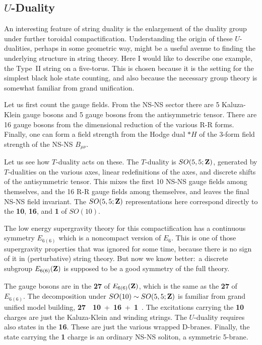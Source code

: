 \subsection{$U$-Duality}

An interesting feature of string duality is the enlargement of the duality
group under further toroidal compactification.  Understanding the origin of
these $U$-dualities, perhaps in some geometric way, might be a useful avenue
to finding the underlying structure in string theory.  Here I would like to
describe one example, the Type~II string on a five-torus.  This is chosen
because it is the setting for the simplest black hole state counting, and
also because the necessary group theory is somewhat familiar from grand
unification.

Let us first count the gauge fields.  From the NS-NS sector there are 5
Kaluza-Klein gauge bosons and 5 gauge bosons from the antisymmetric tensor. 
There are 16 gauge bosons from the dimensional reduction of the various R-R
forms.  Finally, one can form a field strength from the Hodge dual $*H$ of
the 3-form field strength of the NS-NS $B_{\mu\nu}$.

Let us see how $T$-duality acts on these.  The $T$-duality is $SO(5,5;{\bf Z})$,
generated by $T$-dualities on the various axes, linear redefinitions of the
axes, and discrete shifts of the antisymmetric tensor.  This mixes the first
10 NS-NS gauge fields among themselves, and the 16 R-R gauge fields among
themselves, and leaves the final NS-NS field invariant.
The $SO(5,5;{\bf Z})$ representations here correspond directly to the {\bf 10},
{\bf 16}, and {\bf 1} of $SO(10)$.

The low energy supergravity theory for this compactification has a
continuous symmetry $E_{6(6)}$ which is a noncompact version of
$E_6$.\cite{julia}  This is one of those supergravity properties that was
ignored for some time, because there is no sign of it in (perturbative)
string theory. But now we know better:\,\cite{hullt} a discrete subgroup
$E_{6(6)}({\bf Z})$ is supposed to be a good symmetry of the full theory.

The gauge bosons are in the {\bf 27} of $E_{6(6)}({\bf Z})$, which is the same as
the {\bf 27} of $E_{6(6)}$.  The decomposition under $SO(10)
\sim SO(5,5;{\bf Z})$ is familiar from grand unified model building,
\be
{\bf 27}\ \to\ {\bf 10}\ +\ {\bf 16}\ +\ {\bf 1}\ .
\ee
The excitations carrying the {\bf 10} charges are just the Kaluza-Klein and
winding strings.  The $U$-duality requires also states in the {\bf 16}.
These are just the various wrapped D-branes.  Finally, the state
carrying the {\bf 1} charge is an ordinary NS-NS soliton, a symmetric
5-brane.\cite{chs}

